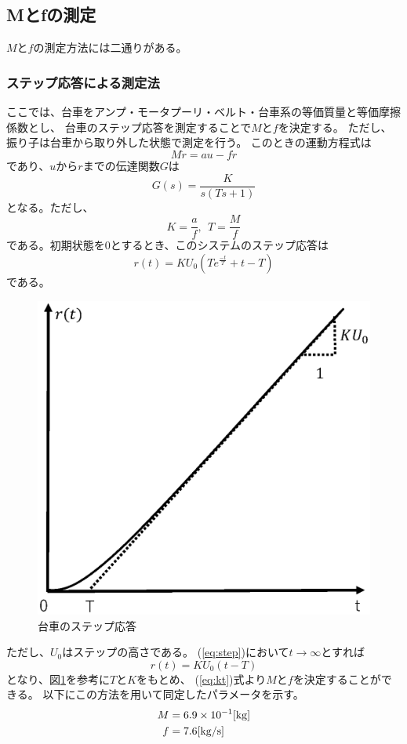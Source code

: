 \subsection{Mとfの測定}
	
	$M$と$f$の測定方法には二通りがある。
	\subsubsection{ステップ応答による測定法}
		ここでは、台車をアンプ・モータプーリ・ベルト・台車系の等価質量と等価摩擦係数とし、
		台車のステップ応答を測定することで$M$と$f$を決定する。
		ただし、振り子は台車から取り外した状態で測定を行う。
		このときの運動方程式は
		\[
			M\ddot{r} = au - f\dot{r}
		\]
		であり、$u$から$r$までの伝達関数$G$は
		\[
			G(s) = \frac{K}{s(Ts+1)}
		\]
		となる。ただし、
		\begin{equation}
			K = \frac{a}{f},\ \ T=\frac{M}{f}
			\label{eq:kt}
		\end{equation}
		である。初期状態を0とするとき、このシステムのステップ応答は
		\begin{equation}
			r(t) = KU_{0}\left(Te^{\frac{-t}{T}}+t-T\right)
			\label{eq:step}
		\end{equation}
		である。
		\begin{figure}[H]
			\centering
			\includegraphics[width=0.6\linewidth]{gazo/step.eps}
			\caption{台車のステップ応答}
			\label{image:parameterMF}
		\end{figure}
		\noindent
		ただし、$U_{0}$はステップの高さである。
		(\ref{eq:step})において$t→\infty$とすれば
		\[
			r(t) = KU_{0}(t-T)
		\]
		となり、図\ref{image:parameterMF}を参考に$T$と$K$をもとめ、
		(\ref{eq:kt})式より$M$と$f$を決定することができる。
		以下にこの方法を用いて同定したパラメータを示す。
		\begin{align*}
			M&=6.9\times10^{-1}[\rm{kg}]\\
			f&=7.6[\rm{kg/s}]
		\end{align*}
		
